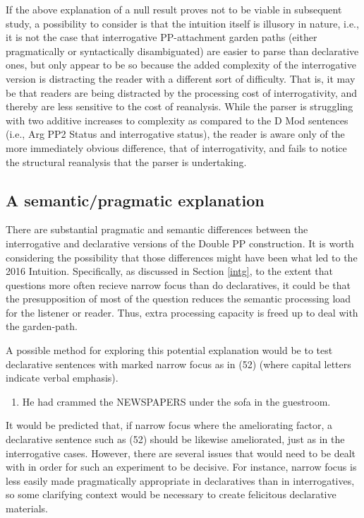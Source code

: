 \documentclass[11pt,oneside]{book}
\providecommand{\tightlist}{%
  \setlength{\itemsep}{0pt}\setlength{\parskip}{0pt}}
\begin{document}
If the above explanation of a null result proves not to be viable in subsequent study, a possibility to consider is that the intuition itself is illusory in nature, i.e., it is not the case that interrogative PP-attachment garden paths (either pragmatically or syntactically disambiguated) are easier to parse than declarative ones, but only appear to be so because the added complexity of the interrogative version is distracting the reader with a different sort of difficulty. That is, it may be that readers are being distracted by the processing cost of interrogativity, and thereby are less sensitive to the cost of reanalysis. While the parser is struggling with two additive increases to complexity as compared to the D Mod sentences (i.e., Arg PP2 Status and interrogative status), the reader is aware only of the more immediately obvious difference, that of interrogativity, and fails to notice the structural reanalysis that the parser is undertaking.

\hypertarget{sem}{%
\subsection{A semantic/pragmatic explanation}\label{sem}}

There are substantial pragmatic and semantic differences between the interrogative and declarative versions of the Double PP construction. It is worth considering the possibility that those differences might have been what led to the 2016 Intuition. Specifically, as discussed in Section \ref{intg}, to the extent that questions more often recieve narrow focus than do declaratives, it could be that the presupposition of most of the question reduces the semantic processing load for the listener or reader. Thus, extra processing capacity is freed up to deal with the garden-path.

A possible method for exploring this potential explanation would be to test declarative sentences with marked narrow focus as in (52) (where capital letters indicate verbal emphasis).

\begin{enumerate}
\def\labelenumi{(\arabic{enumi})}
\setcounter{enumi}{51}
\tightlist
\item
  He had crammed the NEWSPAPERS under the sofa in the guestroom.
\end{enumerate}

It would be predicted that, if narrow focus where the ameliorating factor, a declarative sentence such as (52) should be likewise ameliorated, just as in the interrogative cases. However, there are several issues that would need to be dealt with in order for such an experiment to be decisive. For instance, narrow focus is less easily made pragmatically appropriate in declaratives than in interrogatives, so some clarifying context would be necessary to create felicitous declarative materials.
\end{document}
